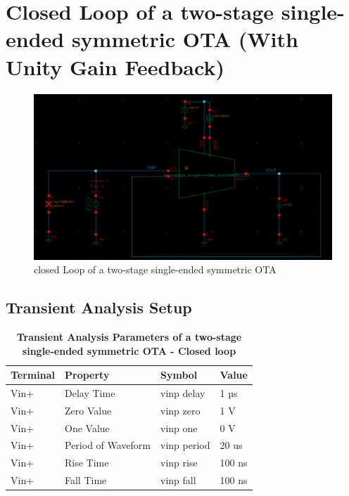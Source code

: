 \newpage
\section{Closed Loop of a two-stage single-ended symmetric OTA  (With Unity Gain Feedback)}
    \begin{figure}[h]
        \centering
           \includegraphics[width=1\textwidth]{images/two_stage_ota_close.png}
        \caption{closed Loop of a two-stage single-ended symmetric OTA  }
        \label{fig: }
    \end{figure}
    
\subsection{Transient Analysis Setup}

\begin{table}[h]
    \centering
    \captionsetup{justification=centering} %
    \caption*{\textbf{Transient Analysis Parameters of a two-stage single-ended symmetric OTA - Closed loop}} %
    \begin{tabular}{l l l l}
        \toprule
        Terminal & Property & Symbol & Value \\
        \midrule
        Vin+ & Delay Time & vinp delay & 1 µs \\
        Vin+ & Zero Value & vinp zero & 1 V \\
        Vin+ & One Value & vinp one & 0 V \\
        Vin+ & Period of Waveform & vinp period & 20 us \\
        Vin+ & Rise Time & vinp rise & 100 ns \\
        Vin+ & Fall Time & vinp fall & 100 ns \\
        \bottomrule
    \end{tabular}
    \label{tab:transient_analysis}
\end{table}


